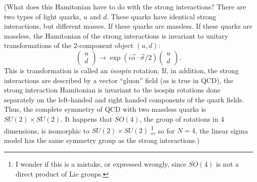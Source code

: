 (What does this Hamitonian have to do with the strong interactions? There are two types of light quarks, 
$u$ and $d$. These quarks have identical strong interactions, but different masses. If these quarks are
massless. If these quarks are massless, the Hamitonian of the strong interactions is invariant to unitary
transformations of the 2-component object $(u, d)$:
\begin{equation*}
    \begin{pmatrix}
        u \\ d
    \end{pmatrix} \to \exp(i\vec{\alpha}\cdot\vec{\sigma} / 2)
    \begin{pmatrix}
        u \\ d
    \end{pmatrix}.
\end{equation*}
This is transformation is called an \textit{isospin} rotation. If, in addition, the strong interactions 
are described by a vector ``gluon'' field (as is true in QCD), the strong interaction Hamitonian is invariant
to the isospin rotations done separately on the left-handed and right handed components of the quark fields.
Thus, the complete symmetry of QCD with two massless quarks is $SU(2)\times SU(2)$. It happens that $SO(4)$,
the group of rotations in 4 dimensions, is isomorphic to $SU(2)\times SU(2)$
\footnote{I wonder if this is a mistake, or expressed wrongly, since $SO(4)$ is not a direct product of Lie groups.}, 
so for $N = 4$, the linear 
sigma model has the same symmetry group as the strong interactions.)
